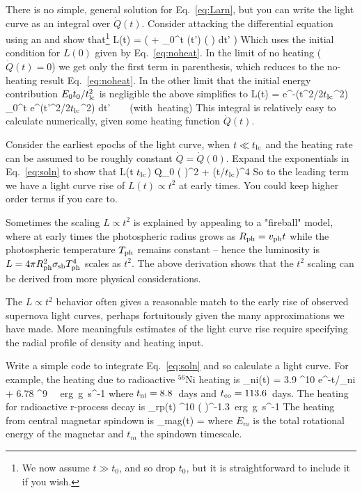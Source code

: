 \documentclass{tufte-handout}
\newcommand{\tlc}{\ensuremath{t_{\rm lc}}}
\begin{document}
  There is no simple, general solution for Eq.~\ref{eq:Larn}, but you
can write the light curve as an integral over $\dot{Q}(t)$.  Consider
attacking the differential equation using an  and show that\footnote{We now assume $t \gg t_0$, and so drop $t_0$, but it is straightforward
to include it if you wish.}
\beq
L(t) = \exp[-\frac{t^2}{2 \tlc^2}]
\left( \frac{E_0 R_0}{v \tlc^2}  + 
 \int_0^t 
(t') 
\left( \frac{t'}{\tlc^2}\right)
\exp[\frac{t'^2}{2 \tlc^2}]
dt' \right)
\eeq
Which uses the initial condition for $L(0)$ given by Eq.~\ref{eq:noheat}.
In the limit of no heating ($\dot{Q}(t) = 0$) we get only the first term in parenthesis, which reduces to the no-heating result
Eq.~\ref{eq:noheat}. In the other limit that the initial energy contribution $E_0 t_0/\tlc^2$ is negligible the above simplifies to
\beq
L(t) = 
e^{-(t^2/2\tlc^2)}
 \int_0^t 
 \frac{\dot{Q}(t') t'}{\tlc^2}
e^{(t'^2/2\tlc^2)}
dt'~~~~{\rm (with~heating)}
\label{eq:soln}
\eeq
This integral is relatively easy to calculate numerically, given some heating function $\dot{Q}(t)$.

  Consider the earliest epochs of the light curve, when $t \ll \tlc$ and the heating
rate can be assumed to be roughly constant $\dot{Q} = \dot{Q}(0)$. Expand  the exponentials in Eq.~\ref{eq:soln} to
show that
\beq
L(t \ll \tlc) \approx Q_0 \left( \frac{t}{\tlc} \right)^2  + (t/\tlc)^4 
\eeq
So to the leading term we have a light curve rise of $L(t) \propto t^2$ at early times. You could keep higher order terms if you care to.

\comment Sometimes the scaling $L \propto t^2$
is explained by appealing to a "fireball" model, where at early times the photospheric radius grows as $R_{\rm ph} = v_{\rm ph} t$ while the photospheric temperature $T_{\rm ph}$ remains constant -- hence the luminosity is $L = 4 \pi R_{\rm ph}^2 \sigma_{\rm sb} T_{\rm ph}^4$ scales as $t^2$. The above derivation shows that the $t^2$ scaling can be derived from more physical
considerations. 

The $L \propto t^2$ behavior often gives a reasonable match to the early rise of observed supernova light curves, perhaps fortuitously given the many approximations we have made. More meaningfuls estimates of the light curve rise require specifying the radial profile of density and heating input.

 Write a simple code to integrate Eq.~\ref{eq:soln} and so calculate a light curve. For example, the heating due to radioactive $^{56}$Ni heating is  
\beq
{}_{\rm ni}(t) = 3.9 ^{10} e^{-t/\tau_{\rm ni}} + 6.78 ^9 \left[ e^{-t/t_{\rm co}} 
-e^{-t/t_{\rm ni}} \right]~~{\rm erg~g~s^{-1}}
\eeq
where $t_{\rm ni} = 8.8$~days and $t_{\rm co} = 113.6$~days. The heating for radioactive r-process decay is
\beq
{}_{\rm rp}(t)  ^{10} \left(  \right)^{-1.3}~{\rm erg~g~s^{-1}}
\eeq
The heating from central magnetar spindown is
\beq
{}_{\rm mag}(t) = 
\eeq
where $E_m$ is the total rotational energy of the magnetar and $t_m$ the spindown timescale.
\end{document}
